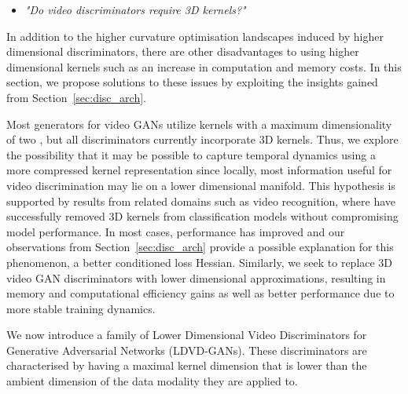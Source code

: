 \documentclass[a4paper,fleqn]{cas-sc}
\begin{document}
\begin{itemize}
    \item \textit{"Do video discriminators require 3D kernels?"}
\end{itemize}

In addition to the higher curvature optimisation landscapes induced by higher dimensional discriminators, there are other disadvantages to using higher dimensional kernels such as an increase in computation and memory costs. In this section, we propose solutions to these issues by exploiting the insights gained from Section~\ref{sec:disc_arch}.


Most generators for video GANs utilize kernels with a maximum dimensionality of two \cite{SaitoMS17temporal,Tulyakov0YK18mocogan, saito2018tganv2}, but all discriminators currently incorporate 3D kernels.  Thus, we explore the possibility that it may be possible to capture temporal dynamics using a more compressed kernel representation since locally, most information useful for video discrimination may lie on a lower dimensional manifold. This hypothesis is supported by results from related domains such as video recognition, where \cite{TranWTRLP18r2plus1d,FeichtenhoferPW16spatiotemporal,SunJYS15factorized,QiuYM17pseudo3D,XieSHTM18rethinking,linGHtsm} have successfully removed 3D kernels from classification models without compromising model performance. In most cases, performance has improved and our observations from Section~\ref{sec:disc_arch} provide a possible explanation for this phenomenon, a better conditioned loss Hessian. Similarly, we seek to replace 3D video GAN discriminators with lower dimensional approximations, resulting in memory and computational efficiency gains as well as better performance due to more stable training dynamics.

We now introduce a family of Lower Dimensional Video Discriminators for Generative Adversarial Networks (LDVD-GANs). These discriminators are characterised by having a maximal kernel dimension that is lower than the ambient dimension of the data modality they are applied to.
\end{document}
